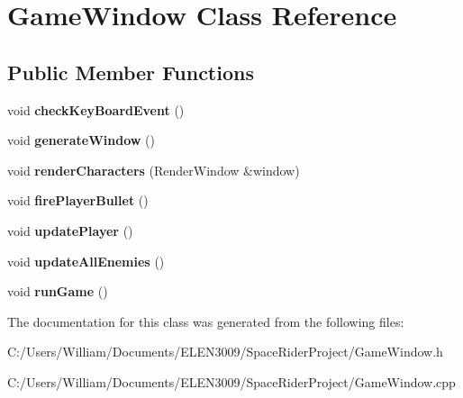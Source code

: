 \hypertarget{class_game_window}{}\section{Game\+Window Class Reference}
\label{class_game_window}
\subsection*{Public Member Functions}
\begin{DoxyCompactItemize}
\item 
\mbox{\label{class_game_window_a6d969bf2a5284c731c5ba3eb03d4e3a1}} 
void {\bfseries check\+Key\+Board\+Event} ()
\item 
\mbox{\label{class_game_window_a43f64127a3b8836405f80242c1e997f4}} 
void {\bfseries generate\+Window} ()
\item 
\mbox{\label{class_game_window_ac32c7b2e85e30f5bab516551c6277c3a}} 
void {\bfseries render\+Characters} (Render\+Window \&window)
\item 
\mbox{\label{class_game_window_a119f405a2ff052c74d902c5b02bf0f05}} 
void {\bfseries fire\+Player\+Bullet} ()
\item 
\mbox{\label{class_game_window_a9ebcf385e9ed9fd52f1d8b2c88f9c091}} 
void {\bfseries update\+Player} ()
\item 
\mbox{\label{class_game_window_a62ed57d80a4eb7945777f5d383747bdf}} 
void {\bfseries update\+All\+Enemies} ()
\item 
\mbox{\label{class_game_window_aa4188b605313be96d69cf32d3f143987}} 
void {\bfseries run\+Game} ()
\end{DoxyCompactItemize}


The documentation for this class was generated from the following files\+:\begin{DoxyCompactItemize}
\item 
C\+:/\+Users/\+William/\+Documents/\+E\+L\+E\+N3009/\+Space\+Rider\+Project/Game\+Window.\+h\item 
C\+:/\+Users/\+William/\+Documents/\+E\+L\+E\+N3009/\+Space\+Rider\+Project/Game\+Window.\+cpp\end{DoxyCompactItemize}
